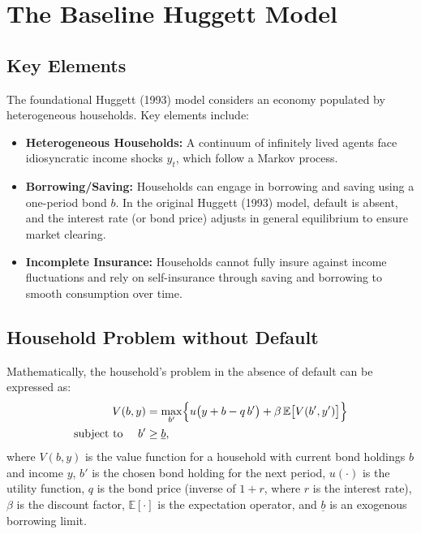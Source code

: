 \documentclass[acmsmall]{acmart}
\begin{document}
\section*{The Baseline Huggett Model}

\subsection*{Key Elements}

The foundational Huggett (1993) model considers an economy populated by heterogeneous households. Key elements include:

\begin{itemize}
    \item \textbf{Heterogeneous Households:} A continuum of infinitely lived agents face idiosyncratic income shocks $y_t$, which follow a Markov process.
    \item \textbf{Borrowing/Saving:} Households can engage in borrowing and saving using a one-period bond $b$. In the original Huggett (1993) model, default is absent, and the interest rate (or bond price) adjusts in general equilibrium to ensure market clearing.
    \item \textbf{Incomplete Insurance:} Households cannot fully insure against income fluctuations and rely on self-insurance through saving and borrowing to smooth consumption over time.
\end{itemize}

\subsection*{Household Problem without Default}

Mathematically, the household's problem in the absence of default can be expressed as:
\begin{equation}
\begin{aligned}
V(b, y) &= \max_{b'} \Bigl\{ u\bigl(y + b - q\,b'\bigr) + \beta \,\mathbb{E}\bigl[V(b', y')\bigr] \Bigr\} \\
\text{subject to } \quad b' &\ge \underline{b},
\end{aligned}
\end{equation}
where $V(b, y)$ is the value function for a household with current bond holdings $b$ and income $y$, $b'$ is the chosen bond holding for the next period, $u(\cdot)$ is the utility function, $q$ is the bond price (inverse of $1+r$, where $r$ is the interest rate), $\beta$ is the discount factor, $\mathbb{E}[\cdot]$ is the expectation operator, and $\underline{b}$ is an exogenous borrowing limit.
\end{document}
